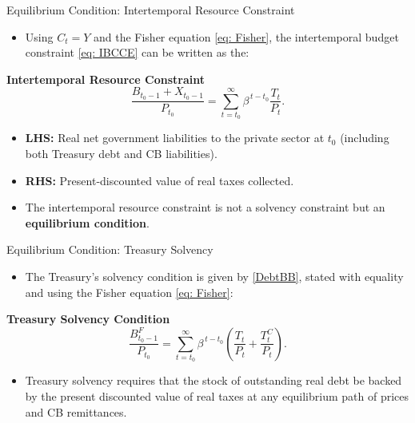 \documentclass[11pt,aspectratio=169]{beamer}
\begin{document}
\begin{frame}{Equilibrium Condition: Intertemporal Resource Constraint}
\begin{itemize}
  \item Using $C_t=Y$ and the Fisher equation \eqref{eq: Fisher}, the intertemporal budget constraint \eqref{eq: IBCCE} can be written as the:
\end{itemize}
\noindent\textbf{Intertemporal Resource Constraint}
\vspace{0.25cm}
\begin{equation}
  \frac{B_{t_{0}-1} + X_{t_{0}-1}}{P_{t_{0}}}
  = \sum_{t=t_{0}}^{\infty} \beta^{\,t-t_{0}} \frac{T_t}{P_t}
  .\label{eq: IBCTT}
\end{equation}

\vspace{0.25cm}
\begin{itemize}
  \item \textbf{LHS:} Real net government liabilities to the private sector at $t_0$ 
        (including both Treasury debt and CB liabilities).
  \item \textbf{RHS:} Present-discounted value of real taxes collected.
  \item The intertemporal resource constraint is not a solvency constraint but an \textbf{equilibrium condition}.  
\end{itemize}
\end{frame}

\begin{frame}{Equilibrium Condition: Treasury Solvency}
\begin{itemize}
    \item The Treasury’s solvency condition is given by \eqref{DebtBB}, stated with equality and using the Fisher equation \eqref{eq: Fisher}:
\end{itemize}

\vspace{0.35cm}
\noindent\textbf{Treasury Solvency Condition}
\begin{equation}
  \frac{B_{t_0-1}^{F}}{P_{t_0}}
  = \sum_{t=t_0}^{\infty} \beta^{\,t-t_0}
    \left(\frac{T_t}{P_t} + \frac{T_t^{C}}{P_t} \right).
    \label{eq: Treasury Solvency}
\end{equation}
\vspace{0.35cm}
\begin{itemize}
    \item Treasury solvency requires that the stock of outstanding real debt be backed by the present discounted value of real taxes at any equilibrium path of prices and CB remittances.
\end{itemize}
\end{frame}
\end{document}
